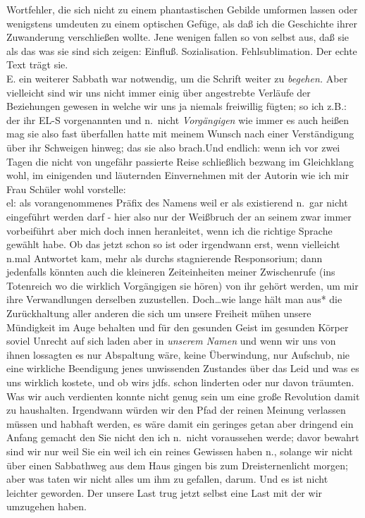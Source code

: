 \documentclass[
]{article}
\begin{document}
\begin{enumerate}
  Wortfehler, die sich nicht zu einem phantastischen Gebilde umformen
  lassen oder wenigstens umdeuten zu einem optischen Gefüge, als daß ich
  die Geschichte ihrer Zuwanderung verschließen wollte. Jene wenigen
  fallen so von selbst aus, daß sie als das was sie sind sich zeigen:
  Einfluß. Sozialisation. Fehlsublimation. Der echte Text trägt sie.\\
  E. ein weiterer Sabbath war notwendig, um die Schrift weiter zu
  \emph{begehen.} Aber vielleicht sind wir uns nicht immer einig über
  angestrebte Verläufe der Beziehungen gewesen in welche wir uns ja
  niemals freiwillig fügten; so ich z.B.: der ihr EL-S vorgenannten und
  n.~nicht \emph{Vorgängigen} wie immer es auch heißen mag sie also fast
  überfallen hatte mit meinem Wunsch nach einer Verständigung über ihr
  Schweigen hinweg; das sie also brach.Und endlich: wenn ich vor zwei
  Tagen die nicht von ungefähr passierte Reise schließlich bezwang im
  Gleichklang wohl, im einigenden und läuternden Einvernehmen mit der
  Autorin wie ich mir Frau Schüler wohl vorstelle:\\
  el: als vorangenommenes Präfix des Namens weil er als existierend
  n.~gar nicht eingeführt werden darf - hier also nur der Weißbruch der
  an seinem zwar immer vorbeiführt aber mich doch innen heranleitet,
  wenn ich die richtige Sprache gewählt habe. Ob das jetzt schon so ist
  oder irgendwann erst, wenn vielleicht n.mal Antwortet kam, mehr als
  durchs stagnierende Responsorium; dann jedenfalls könnten auch die
  kleineren Zeiteinheiten meiner Zwischenrufe (ins Totenreich wo die
  wirklich Vorgängigen sie hören) von ihr gehört werden, um mir ihre
  Verwandlungen derselben zuzustellen. Doch\ldots* wie lange hält man
  aus* die Zurückhaltung aller anderen die sich um unsere Freiheit mühen
  unsere Mündigkeit im Auge behalten und für den gesunden Geist im
  gesunden Körper soviel Unrecht auf sich laden aber in \emph{unserem
  Namen} und wenn wir uns von ihnen lossagten es nur Abspaltung wäre,
  keine Überwindung, nur Aufschub, nie eine wirkliche Beendigung jenes
  unwissenden Zustandes über das Leid und was es uns wirklich kostete,
  und ob wirs jdfs. schon linderten oder nur davon träumten. Was wir
  auch verdienten konnte nicht genug sein um eine große Revolution damit
  zu haushalten. Irgendwann würden wir den Pfad der reinen Meinung
  verlassen müssen und habhaft werden, es wäre damit ein geringes getan
  aber dringend ein Anfang gemacht den Sie nicht den ich n.~nicht
  voraussehen werde; davor bewahrt sind wir nur weil Sie ein weil ich
  ein reines Gewissen haben n., solange wir nicht über einen Sabbathweg
  aus dem Haus gingen bis zum Dreisternenlicht morgen; aber was taten
  wir nicht alles um ihm zu gefallen, darum. Und es ist nicht leichter
  geworden. Der unsere Last trug jetzt selbst eine Last mit der wir
  umzugehen haben.
\end{enumerate}
\end{document}
